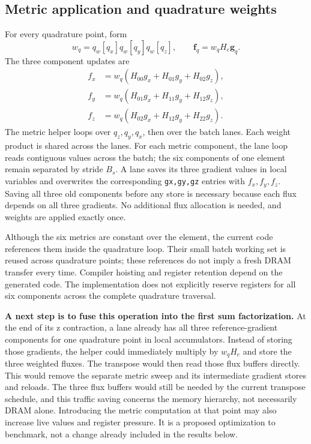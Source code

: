 \documentclass[11pt]{article}
\begin{document}
\subsection{Metric application and quadrature weights}

For every quadrature point, form
\[
 w_q=q_w[q_x]q_w[q_y]q_w[q_z],\qquad
 \boldsymbol{f}_q=w_qH_e\boldsymbol{g}_q.
\]
The three component updates are
\[
\begin{aligned}
 f_x&=w_q(H_{00}g_x+H_{01}g_y+H_{02}g_z),\\
 f_y&=w_q(H_{01}g_x+H_{11}g_y+H_{12}g_z),\\
 f_z&=w_q(H_{02}g_x+H_{12}g_y+H_{22}g_z).
\end{aligned}
\]
The metric helper loops over \(q_z,q_y,q_x\), then over the batch lanes.
Each weight product is shared across the lanes. For each metric component,
the lane loop reads contiguous values across the batch; the six components
of one element remain separated by stride \(B_s\). A lane saves its three
gradient values in local variables and overwrites the corresponding
\texttt{gx,gy,gz} entries with \(f_x,f_y,f_z\).
Saving all three old components before any store is
necessary because each flux depends on all three gradients.
No additional flux allocation is needed, and weights are applied exactly once.

Although the six metrics are constant over the element, the current code
references them inside the quadrature loop. Their small batch working set is
reused across quadrature points; these references do not imply a fresh DRAM
transfer every time. Compiler hoisting and register retention depend on the
generated code. The implementation does not explicitly reserve registers for
all six components across the complete quadrature traversal.

\textbf{A next step is to fuse this operation into the first sum
factorization.} At the end of its z contraction, a lane already has all three
reference-gradient components for one quadrature point in local accumulators.
Instead of storing those gradients, the helper could immediately multiply by
\(w_qH_e\) and store the three weighted fluxes. The transpose would then read
those flux buffers directly.
This would remove the separate metric sweep and its intermediate gradient
stores and reloads. The three flux buffers would still be needed by the
current transpose schedule, and this traffic saving concerns the memory
hierarchy, not necessarily DRAM alone. Introducing the metric computation at
that point may also increase live values and register pressure. It is a
proposed optimization to benchmark, not a change already included in the
results below.
\end{document}
